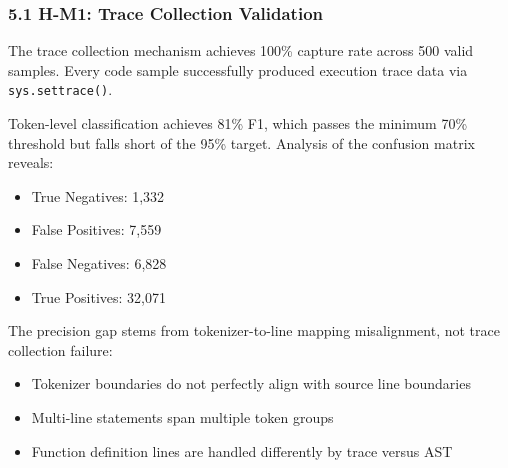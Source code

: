 
\subsubsection{5.1 H-M1: Trace Collection Validation}

\begin{table}[htbp]
\centering
{}
\end{table}

The trace collection mechanism achieves 100\% capture rate across 500 valid samples. Every code sample successfully produced execution trace data via \texttt{sys.settrace()}.

Token-level classification achieves 81\% F1, which passes the minimum 70\% threshold but falls short of the 95\% target. Analysis of the confusion matrix reveals:

\begin{itemize}
\item True Negatives: 1,332
\item False Positives: 7,559
\item False Negatives: 6,828
\item True Positives: 32,071
\end{itemize}

The precision gap stems from tokenizer-to-line mapping misalignment, not trace collection failure:
\begin{itemize}
\item Tokenizer boundaries do not perfectly align with source line boundaries
\item Multi-line statements span multiple token groups
\item Function definition lines are handled differently by trace versus AST
\end{itemize}

